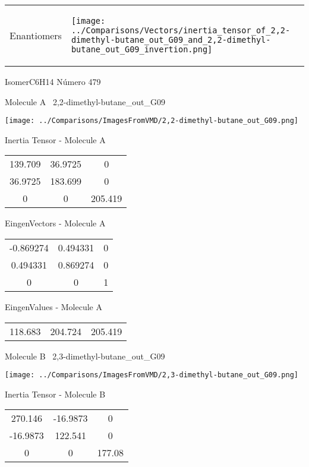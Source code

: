 \vtab[-5mm]
\begin{tabular}{*{2}{m{}}}
\begin{center}
\textcolor{NavyBlue}{\Large Enantiomers}
\end{center}
&
\begin{center}
\texttt{[image: ../Comparisons/Vectors/inertia\_tensor\_of\_2,2-dimethyl-butane\_out\_G09\_and\_2,2-dimethyl-butane\_out\_G09\_invertion.png]}
\end{center}
\end{tabular}

 \newpage

\vtab[-3cm]
\begin{center}
{\large IsomerC6H14 \tab Número 479}
\end{center}
\begin{multicols}{2}
\begin{center}

Molecule A \
2,2-dimethyl-butane\_out\_G09

\texttt{[image: ../Comparisons/ImagesFromVMD/2,2-dimethyl-butane\_out\_G09.png]}

Inertia Tensor - Molecule A \\
\begin{tabular}{|c c c|}
139.709	 & 	36.9725	 & 	0	 \\
36.9725	 & 	183.699	 & 	0	 \\
0	 & 	0	 & 	205.419
\end{tabular}

\vtab
 EingenVectors - Molecule A     \\
\begin{tabular}{|c c c|}
-0.869274	 & 	0.494331	 & 	0	 \\
0.494331	 & 	0.869274	 & 	0	 \\
0	 & 	0	 & 	1
\end{tabular}

\vtab
 EingenValues - Molecule A     \\
\begin{tabular}{|c c c|}
118.683	 & 	204.724	 & 	205.419	 \\
\end{tabular}
\columnbreak

Molecule B \
2,3-dimethyl-butane\_out\_G09

\texttt{[image: ../Comparisons/ImagesFromVMD/2,3-dimethyl-butane\_out\_G09.png]}

Inertia Tensor - Molecule B \\
\begin{tabular}{|c c c|}
270.146	 & 	-16.9873	 & 	0	 \\
-16.9873	 & 	122.541	 & 	0	 \\
0	 & 	0	 & 	177.08
\end{tabular}


\end{center}
\end{multicols}
